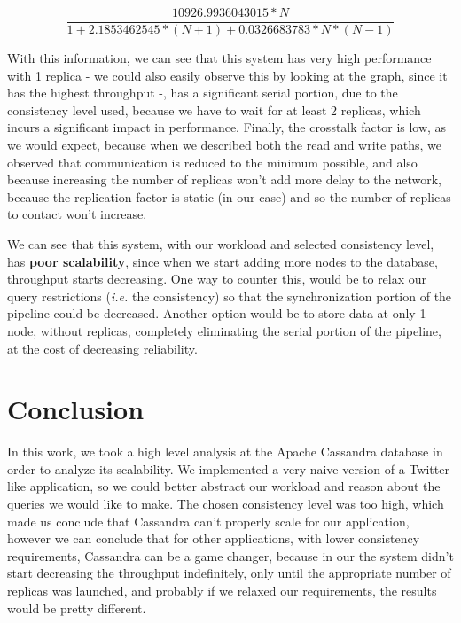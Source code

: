 \documentclass[runningheads]{llncs}
\begin{document}
\[ \frac{10926.9936043015 * N}{1 + 2.1853462545 * (N + 1) +  0.0326683783 * N * (N - 1)} \]

With this information, we can see that this system has very high performance with 1 replica - we could also easily observe this by looking at the graph, since it has the highest throughput -, has a significant serial portion, due to the consistency level used, because we have to wait for at least 2 replicas, which incurs a significant impact in performance. Finally, the crosstalk factor is low, as we would expect, because when we described both the read and write paths, we observed that communication is reduced to the minimum possible, and also because increasing the number of replicas won't add more delay to the network, because the replication factor is static (in our case) and so the number of replicas to contact won't increase.\par

We can see that this system, with our workload and selected consistency level, has \textbf{poor scalability}, since when we start adding more nodes to the database, throughput starts decreasing. One way to counter this, would be to relax our query restrictions (\emph{i.e.} the consistency) so that the synchronization portion of the pipeline could be decreased. Another option would be to store data at only 1 node, without replicas, completely eliminating the serial portion of the pipeline, at the cost of decreasing reliability.

\section{Conclusion}

In this work, we took a high level analysis at the Apache Cassandra database in order to analyze its scalability. We implemented a very naive version of a Twitter-like application, so we could better abstract our workload and reason about the queries we would like to make. The chosen consistency level was too high, which made us conclude that Cassandra can't properly scale for our application, however we can conclude that for other applications, with lower consistency requirements, Cassandra can be a game changer, because in our the system didn't start decreasing the throughput indefinitely, only until the appropriate number of replicas was launched, and probably if we relaxed our requirements, the results would be pretty different.\par

\printbibliography
\end{document}
